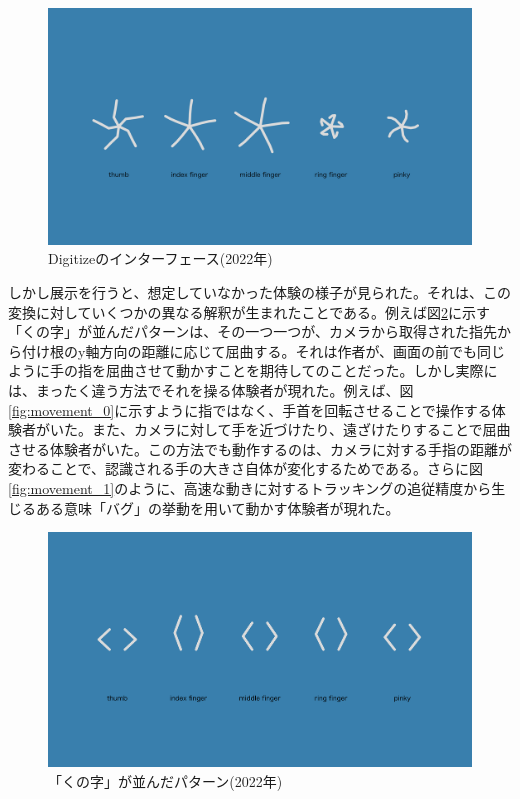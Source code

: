 \begin{figure}[H]
  \centering
  \includegraphics[width=15cm]{img/openhouse2022_interface.png}
  \caption{Digitizeのインターフェース(2022年)}
  \label{fig:exhibit_2022_interface}
\end{figure}

しかし展示を行うと、想定していなかった体験の様子が見られた。それは、この変換に対していくつかの異なる解釈が生まれたことである。例えば図\ref{fig:exhibit_2022_kunoji}に示す「くの字」が並んだパターンは、その一つ一つが、カメラから取得された指先から付け根のy軸方向の距離に応じて屈曲する。それは作者が、画面の前でも同じように手の指を屈曲させて動かすことを期待してのことだった。しかし実際には、まったく違う方法でそれを操る体験者が現れた。例えば、図\ref{fig:movement_0}に示すように指ではなく、手首を回転させることで操作する体験者がいた。また、カメラに対して手を近づけたり、遠ざけたりすることで屈曲させる体験者がいた。この方法でも動作するのは、カメラに対する手指の距離が変わることで、認識される手の大きさ自体が変化するためである。さらに図\ref{fig:movement_1}のように、高速な動きに対するトラッキングの追従精度から生じるある意味「バグ」の挙動を用いて動かす体験者が現れた。

\begin{figure}[H]
  \centering
  \includegraphics[width=15cm]{img/kunoji_2022.png}
  \caption{「くの字」が並んだパターン(2022年)}
  \label{fig:exhibit_2022_kunoji}
\end{figure}

